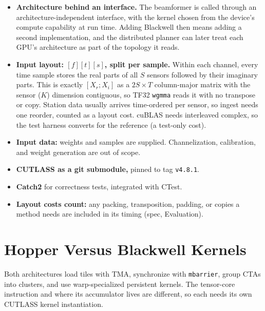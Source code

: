 \documentclass[10pt,letterpaper]{article}
\begin{document}
\begin{itemize}
  \item \textbf{Architecture behind an interface.} The beamformer is called through an architecture-independent interface, with the kernel chosen from the device's compute capability at run time. Adding Blackwell then means adding a second implementation, and the distributed planner can later treat each GPU's architecture as part of the topology it reads.
  \item \textbf{Input layout: $[f][t][s]$, split per sample.} Within each channel, every time sample stores the real parts of all $S$ sensors followed by their imaginary parts. This is exactly $[X_r; X_i]$ as a $2S \times T$ column-major matrix with the sensor ($K$) dimension contiguous, so TF32 \texttt{wgmma} reads it with no transpose or copy. Station data usually arrives time-ordered per sensor, so ingest needs one reorder, counted as a layout cost. cuBLAS needs interleaved complex, so the test harness converts for the reference (a test-only cost).
  \item \textbf{Input data:} weights and samples are supplied. Channelization, calibration, and weight generation are out of scope.
  \item \textbf{CUTLASS as a git submodule,} pinned to tag \texttt{v4.8.1}.
  \item \textbf{Catch2} for correctness tests, integrated with CTest.
  \item \textbf{Layout costs count:} any packing, transposition, padding, or copies a method needs are included in its timing (spec, Evaluation).
\end{itemize}

\section*{Hopper Versus Blackwell Kernels}

Both architectures load tiles with TMA, synchronize with \texttt{mbarrier}, group CTAs into clusters, and use warp-specialized persistent kernels. The tensor-core instruction and where its accumulator lives are different, so each needs its own CUTLASS kernel instantiation.
\end{document}
